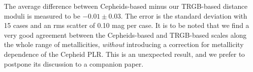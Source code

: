 \documentclass[11pt,preprint2]{aastex}
\begin{document}
The average difference between Cepheids-based minus our TRGB-based distance moduli is measured to be $-0.01 \pm 0.03$. The error is the standard deviation with 15 cases and an rms scatter of 0.10 mag per case. It is to be noted that we find a very good agreement between the Cepheids-based and TRGB-based scales along the whole range of metallicities, {\it without} introducing a correction for metallicity dependence of the Cepheid PLR. This is an unexpected result, and we prefer to postpone its discussion to a companion paper.



\end{document}
